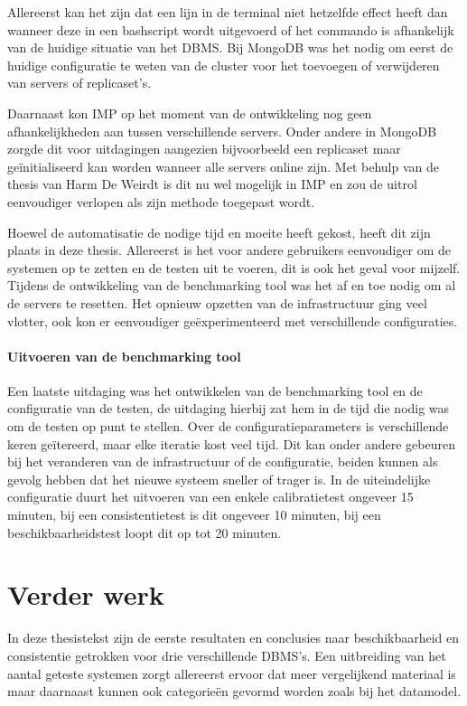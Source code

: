 Allereerst kan het zijn dat een lijn in de terminal niet hetzelfde effect heeft dan wanneer deze in een bashscript wordt uitgevoerd of het commando is afhankelijk van de huidige situatie van het DBMS. Bij MongoDB was het nodig om eerst de huidige configuratie te weten van de cluster voor het toevoegen of verwijderen van servers of replicaset's. 

Daarnaast kon IMP op het moment van de ontwikkeling nog geen afhankelijkheden aan tussen verschillende servers. Onder andere in MongoDB zorgde dit voor uitdagingen aangezien bijvoorbeeld een replicaset maar geïnitialiseerd kan worden wanneer alle servers online zijn. Met behulp van de thesis van Harm De Weirdt\cite{thesisHarm} is dit nu wel mogelijk in IMP en zou de uitrol eenvoudiger verlopen als zijn methode toegepast wordt.  

Hoewel de automatisatie de nodige tijd en moeite heeft gekost, heeft dit zijn plaats in deze thesis. Allereerst is het voor andere gebruikers eenvoudiger om de systemen op te zetten en de testen uit te voeren, dit is ook het geval voor mijzelf. Tijdens de ontwikkeling van de benchmarking tool was het af en toe nodig om al de servers te resetten. Het opnieuw opzetten van de infrastructuur ging veel vlotter, ook kon er eenvoudiger geëxperimenteerd met verschillende configuraties. 

\paragraph{Uitvoeren van de benchmarking tool} Een laatste uitdaging was het ontwikkelen van de benchmarking tool en de configuratie van de testen, de uitdaging hierbij zat hem in de tijd die nodig was om de testen op punt te stellen. Over de configuratieparameters is verschillende keren geïtereerd, maar elke iteratie kost veel tijd. Dit kan onder andere gebeuren bij het veranderen van de infrastructuur of de configuratie, beiden kunnen als gevolg hebben dat het nieuwe systeem sneller of trager is. In de uiteindelijke configuratie duurt het uitvoeren van een enkele calibratietest ongeveer 15 minuten, bij een consistentietest is dit ongeveer 10 minuten, bij een beschikbaarheidstest loopt dit op tot 20 minuten. 

\section{Verder werk}
In deze thesistekst zijn de eerste resultaten en conclusies naar beschikbaarheid en consistentie getrokken voor drie verschillende DBMS's. Een uitbreiding van het aantal geteste systemen zorgt allereerst ervoor dat meer vergelijkend materiaal is maar daarnaast kunnen ook categorieën gevormd worden zoals bij het datamodel. 

